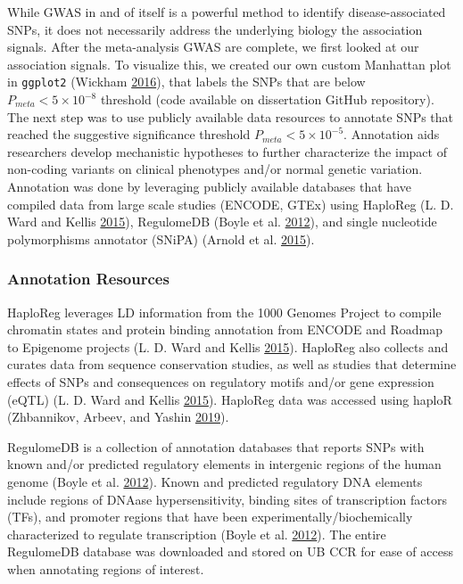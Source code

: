 \documentclass[]{DissertateOSU}
\begin{document}
While GWAS in and of itself is a powerful method to identify
disease-associated SNPs, it does not necessarily address the underlying
biology the association signals. After the meta-analysis GWAS are
complete, we first looked at our association signals. To visualize this,
we created our own custom Manhattan plot in \texttt{ggplot2} (Wickham
\protect\hyperlink{ref-ggplot2}{2016}), that labels the SNPs that are
below \(P_{meta} < 5\times{10}^{-8}\) threshold (code available on
dissertation GitHub repository). The next step was to use publicly
available data resources to annotate SNPs that reached the suggestive
significance threshold \(P_{meta} < 5\times{10}^{-5}\). Annotation aids
researchers develop mechanistic hypotheses to further characterize the
impact of non-coding variants on clinical phenotypes and/or normal
genetic variation. Annotation was done by leveraging publicly available
databases that have compiled data from large scale studies (ENCODE,
GTEx) using HaploReg (L. D. Ward and Kellis
\protect\hyperlink{ref-haploreg}{2015}), RegulomeDB (Boyle et al.
\protect\hyperlink{ref-Boyle_2012}{2012}), and single nucleotide
polymorphisms annotator (SNiPA) (Arnold et al.
\protect\hyperlink{ref-snipa}{2015}).

\subsubsection{Annotation Resources}\label{annotation-resources}

HaploReg leverages LD information from the 1000 Genomes Project to
compile chromatin states and protein binding annotation from ENCODE and
Roadmap to Epigenome projects (L. D. Ward and Kellis
\protect\hyperlink{ref-haploreg}{2015}). HaploReg also collects and
curates data from sequence conservation studies, as well as studies that
determine effects of SNPs and consequences on regulatory motifs and/or
gene expression (eQTL) (L. D. Ward and Kellis
\protect\hyperlink{ref-haploreg}{2015}). HaploReg data was accessed
using haploR (Zhbannikov, Arbeev, and Yashin
\protect\hyperlink{ref-haploR}{2019}).

RegulomeDB is a collection of annotation databases that reports SNPs
with known and/or predicted regulatory elements in intergenic regions of
the human genome (Boyle et al.
\protect\hyperlink{ref-Boyle_2012}{2012}). Known and predicted
regulatory DNA elements include regions of DNAase hypersensitivity,
binding sites of transcription factors (TFs), and promoter regions that
have been experimentally/biochemically characterized to regulate
transcription (Boyle et al. \protect\hyperlink{ref-Boyle_2012}{2012}).
The entire RegulomeDB database was downloaded and stored on UB CCR for
ease of access when annotating regions of interest.
\end{document}
